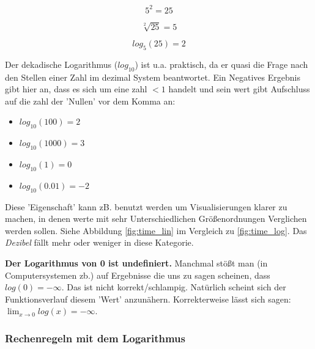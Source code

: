 $$ 5 ^2 =25 $$

$$\sqrt[2]{25} = 5$$

$$ log_5 (25) = 2$$




Der dekadische Logarithmus ($log_{10}$) ist u.a. praktisch, da er quasi die Frage nach den Stellen einer Zahl im dezimal System beantwortet. Ein Negatives Ergebnis gibt hier an, dass es sich um eine zahl $<1$ handelt und sein wert gibt Aufschluss auf die zahl der 'Nullen' vor dem Komma an:

\begin{itemize}
    

\item  $ log_{10}(100) = 2$
\item  $ log_{10}(1000) = 3$
\item  $ log_{10}(1) = 0$
\item  $ log_{10}(0.01) = -2$
\end{itemize}

Diese 'Eigenschaft' kann zB. benutzt werden um Visualisierungen klarer zu machen, in denen werte mit sehr Unterschiedlichen Größenordnungen Verglichen werden sollen. Siehe Abbildung \ref{fig:time_lin} im Vergleich zu \ref{fig:time_log}. Das \emph{Dezibel} fällt mehr oder weniger in diese Kategorie. 

\textbf{Der Logarithmus von 0 ist undefiniert.} Manchmal stößt man (in Computersystemen zb.) auf Ergebnisse die uns zu sagen scheinen, dass  $log(0)=-\infty$. Das ist nicht korrekt/schlampig. Natürlich scheint sich der Funktionsverlauf diesem 'Wert' anzunähern. Korrekterweise lässt sich sagen: $\lim_{x\to 0} log(x)=-\infty$. 


\subsubsection{Rechenregeln mit dem Logarithmus}

